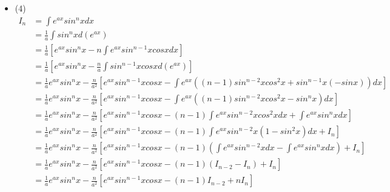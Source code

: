 \documentclass{article}
\begin{document}
\begin{itemize}
\begin{align*}
              & = x (arcsinx)^n + n \sqrt{1 + x^2} (arcsinx)^{n - 1} - n(n - 1) I_{n - 2}                                                                      \\
        \end{align*}
  \item (4)
        \begin{align*}
          I_n & = \int e^{ax} sin^n x dx                                                                                                                              \\
              & = \frac{1}{a} \int sin^n x d(e^{ax})                                                                                                                  \\
              & = \frac{1}{a} \left[e^{ax} sin^n x - n \int e^{ax} sin^{n - 1}xcosx dx \right]                                                                        \\
              & = \frac{1}{a} \left[e^{ax} sin^n x - \frac{n}{a} \int sin^{n - 1}xcosx d(e^{ax}) \right]                                                              \\
              & = \frac{1}{a} e^{ax} sin^n x - \frac{n}{a^2} \left[e^{ax} sin^{n - 1}xcosx - \int e^{ax} ((n-1)sin^{n-2}xcos^2x + sin^{n - 1}x(-sinx)) dx \right]     \\
              & = \frac{1}{a} e^{ax} sin^n x - \frac{n}{a^2} \left[e^{ax} sin^{n - 1}xcosx - \int e^{ax} ((n-1)sin^{n-2}xcos^2x - sin^{n}x) dx\right]                 \\
              & = \frac{1}{a} e^{ax} sin^n x - \frac{n}{a^2} \left[e^{ax} sin^{n - 1}xcosx - (n-1) \int e^{ax} sin^{n-2}xcos^2x dx + \int e^{ax} sin^{n}x dx\right]   \\
              & = \frac{1}{a} e^{ax} sin^n x - \frac{n}{a^2} \left[e^{ax} sin^{n - 1}xcosx - (n-1) \int e^{ax} sin^{n-2}x(1 - sin^2 x) dx + I_n\right]                \\
              & = \frac{1}{a} e^{ax} sin^n x - \frac{n}{a^2} \left[e^{ax} sin^{n - 1}xcosx - (n-1) (\int e^{ax} sin^{n-2}x dx - \int e^{ax} sin^{n}x dx) + I_n\right] \\
              & = \frac{1}{a} e^{ax} sin^n x - \frac{n}{a^2} \left[e^{ax} sin^{n - 1}xcosx - (n-1) (I_{n-2} - I_n) + I_n\right]                                       \\
              & = \frac{1}{a} e^{ax} sin^n x - \frac{n}{a^2} \left[e^{ax} sin^{n - 1}xcosx - (n-1) I_{n-2} + n I_n \right]                                            \\

\end{align*}
\end{itemize}
\end{document}
